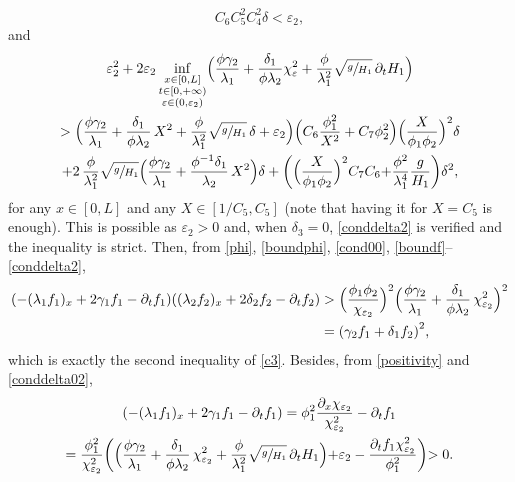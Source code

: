 \begin{equation}
\label{conddelta02}
C_{6}C_{5}^{2}C_{4}^{2}\delta<\varepsilon_{2},
\end{equation}
and
\begin{multline}
\label{conddelta2}
\varepsilon_{2}^{2}+2\varepsilon_{2}\inf_{\substack{x\in[0,L]\\ t\in[0,+\infty)\\\varepsilon\in(0,\varepsilon_{2})}}\Bigl(\frac{\phi \gamma_{2}}{\lambda_{1}}+\frac{\delta_{1}}{\phi\lambda_{2}}\chi_{\varepsilon}^{2}+{\frac{\phi}{\lambda_{1}^{2}}}\sqrt{\sfrac{g}{H_{1}}}\,\partial_{t} H_{1} \Bigl)\\
> \Bigl(\frac{\phi \gamma_{2}}{\lambda_{1}}+\frac{\delta_{1}}{\phi\lambda_{2}}\,X^{2}+{\frac{\phi}{\lambda_{1}^{2}}}\sqrt{\sfrac{g}{H_{1}}}\,\delta+\varepsilon_{2} \Bigr) \Bigl(C_{6}\frac{\phi_{1}^{2}}{X^{2}}+C_{7}\phi_{2}^{2} \Bigr) \Bigl(\frac{X}{\phi_{1}\phi_{2}} \Bigr)^{2}\delta\\
+2\,\frac{\phi}{\lambda_{1}^{2}}\sqrt{\sfrac{g}{H_{1}}} \Bigl(\frac{\phi\gamma_{2}}{\lambda_{1}}+\frac{\phi^{-1}\delta_{1}}{\lambda_{2}}\,X^{2} \Bigr)\delta+\biggl(\Bigl(\frac{X}{\phi_{1}\phi_{2}} \Bigr)^{2}C_{7}C_{6}{+\frac{\phi^{2}}{\lambda_{1}^{4}}\frac{g}{H_{1}}}\biggr)\delta^{2},
\end{multline}
for any $x\in[0,L]$ and any $X\in[1/C_{5},C_{5}]$ ({note} that having it for $X=C_{5}$ is enough). This is possible as $\varepsilon_{2}>0$ and, when $\delta_{3}=0$,
\eqref{conddelta2} is verified and the inequality is strict.
Then, from \eqref{phi}, \eqref{boundphi}, \eqref{cond00}, \eqref{boundf}--\eqref{conddelta2},
\begin{equation*}
\begin{split}
(-(\lambda_{1}f_{1})_{x}+2\gamma_{1}f_{1}-\partial_{t}f_{1})((\lambda_{2}f_{2})_{x}+2\delta_{2}f_{2}-\partial_{t}f_{2})&>
\Bigl(\frac{\phi_{1}\phi_{2}}{\chi_{\varepsilon_{2}}} \Bigr)^{2} \Bigl(\frac{\phi \gamma_{2}}{\lambda_{1}}+\frac{\delta_{1}}{\phi\lambda_{2}}\,\chi_{\varepsilon_{2}}^{2} \Bigr)^{2}\\
&={\left(\gamma_{2}f_{1}+\delta_{1}f_{2}\right)^{2}},\\
\end{split}
\end{equation*}
which is exactly the second inequality of \eqref{c3}. Besides,
from \eqref{positivity} and \eqref{conddelta02},
\begin{multline*}
(-(\lambda_{1}f_{1})_{x}+2\gamma_{1}f_{1}-\partial_{t}f_{1})=\phi_{1}^{2}\frac{\partial_{x}\chi_{\varepsilon_{2}}}{\chi^{2}_{\varepsilon_{2}}}
-\partial_{t}f_{1}
\\
=\frac{\phi_{1}^{2}}{\chi_{\varepsilon_{2}}^{2}}\biggl(
\Bigl(\frac{\phi\gamma_{2}}{\lambda_{1}}+\frac{\delta_{1}}{\phi\lambda_{2}}\,{\chi}_{{\varepsilon_{2}}}^{2}+{\frac{\phi}{\lambda_{1}^{2}}}\sqrt{\sfrac{g}{H_{1}}}\,\partial_{t} H_{1} \Bigl)+{\varepsilon_{2}}
-\frac{\partial_{t}f_{1}\chi_{\varepsilon_{2}}^{2}}{\phi_{1}^{2}}
\biggl)>0.
\end{multline*}

